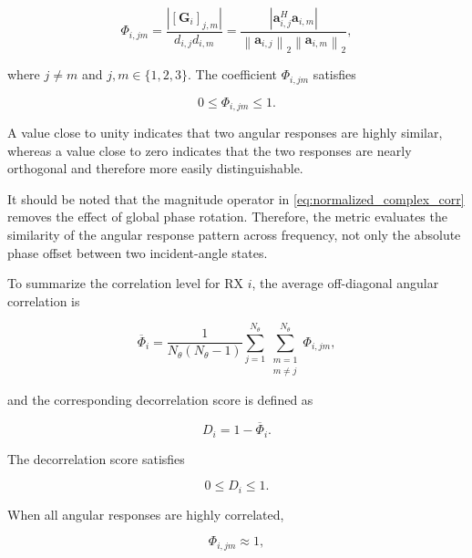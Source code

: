 \documentclass[10pt]{article}
\begin{document}
\begin{equation}
\Phi_{i,jm}
=
\frac{\left|\left[\mathbf{G}_{i}\right]_{j,m}\right|}
{d_{i,j}d_{i,m}}
=
\frac{\left|\mathbf{a}_{i,j}^{H}\mathbf{a}_{i,m}\right|}
{\left\|\mathbf{a}_{i,j}\right\|_2\left\|\mathbf{a}_{i,m}\right\|_2},
\label{eq:normalized_complex_corr}
\end{equation}

where \(j\neq m\) and \(j,m\in\{1,2,3\}\). The coefficient \(\Phi_{i,jm}\) satisfies

\begin{equation}
0 \leq \Phi_{i,jm} \leq 1.
\end{equation}

A value close to unity indicates that two angular responses are highly similar, whereas a value close to zero indicates that the two responses are nearly orthogonal and therefore more easily distinguishable.

It should be noted that the magnitude operator in \eqref{eq:normalized_complex_corr} removes the
effect of global phase rotation. Therefore, the metric evaluates the similarity of the angular
response pattern across frequency, not only the absolute phase offset between two incident-angle
states.

To summarize the correlation level for RX \(i\), the average off-diagonal angular correlation is

\begin{equation}
\overline{\Phi}_{i}
=
\frac{1}{N_{\theta}(N_{\theta}-1)}
\sum_{j=1}^{N_{\theta}}
\sum_{\substack{m=1\\m\neq j}}^{N_{\theta}}
\Phi_{i,jm},
\label{eq:avg_corr}
\end{equation}

and the corresponding decorrelation score is defined as

\begin{equation}
D_i
=
1-\overline{\Phi}_{i}.
\label{eq:decorrelation_metric}
\end{equation}

The decorrelation score satisfies

\begin{equation}
0 \leq D_i \leq 1.
\end{equation}

When all angular responses are highly correlated,

\begin{equation}
\Phi_{i,jm}\approx 1,
\end{equation}
\end{document}
